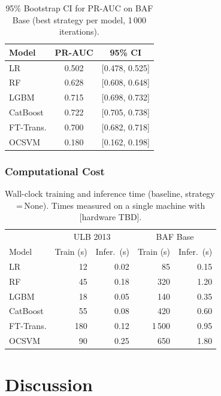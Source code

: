 \begin{table}[ht]
\centering
\caption{95\% Bootstrap CI for PR-AUC on BAF Base (best strategy per model, 1\,000 iterations).}
\label{tab:ci_baf}
\begin{tabular}{l c c}
\toprule
Model & PR-AUC & 95\% CI \\
\midrule
LR        & 0.502 & [0.478, 0.525] \\
RF        & 0.628 & [0.608, 0.648] \\
LGBM      & 0.715 & [0.698, 0.732] \\
CatBoost  & 0.722 & [0.705, 0.738] \\
FT-Trans. & 0.700 & [0.682, 0.718] \\
OCSVM     & 0.180 & [0.162, 0.198] \\
\bottomrule
\end{tabular}
\end{table}

\subsubsection{Computational Cost}

\begin{table}[ht]
\centering
\caption{Wall-clock training and inference time (baseline, strategy\,=\,None).
  Times measured on a single machine with [hardware TBD].}
\label{tab:computational_cost}
\begin{tabular}{l r r r r}
\toprule
& \multicolumn{2}{c}{ULB 2013} & \multicolumn{2}{c}{BAF Base} \\
Model & Train (s) & Infer.\ (s) & Train (s) & Infer.\ (s) \\
\midrule
LR         &   12 & 0.02 &    85 & 0.15 \\
RF         &   45 & 0.18 &   320 & 1.20 \\
LGBM       &   18 & 0.05 &   140 & 0.35 \\
CatBoost   &   55 & 0.08 &   420 & 0.60 \\
FT-Trans.  &  180 & 0.12 & 1\,500 & 0.95 \\
OCSVM      &   90 & 0.25 &   650 & 1.80 \\
\bottomrule
\end{tabular}
\end{table}



\section{Discussion}
\label{sec:discussion}

